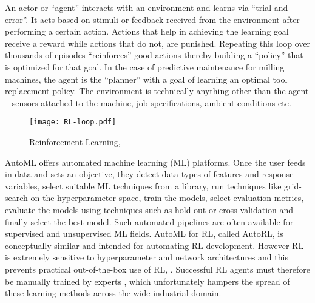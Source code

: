 \documentclass[referee, sn-mathphys-num]{sn-jnl}
\begin{document}
	An actor or ``agent'' interacts with an environment and learns via ``trial-and-error''. It acts based on stimuli or feedback received from the environment after performing a certain action. Actions that help in achieving the learning goal receive a reward while actions that do not, are punished. Repeating this loop over thousands of episodes ``reinforces'' good actions thereby building a ``policy'' that is optimized for that goal. In the case of predictive maintenance for milling machines, the agent is the ``planner'' with a goal of learning an optimal tool replacement policy. The environment is technically anything other than the agent -- sensors attached to the machine, job specifications, ambient conditions etc.
	\begin{figure}[h]
		\centering
		\texttt{[image: RL-loop.pdf]}
		\caption{Reinforcement Learning, \cite{barto2018}}
		\label{fig_RL-loop}
	\end{figure}
	
	AutoML offers automated machine learning (ML) platforms. Once the user feeds in data and sets an objective, they detect data types of features and response variables, select suitable ML techniques from a library, run techniques like grid-search on the hyperparameter space, train the models, select evaluation metrics, evaluate the models using techniques such as hold-out or cross-validation and finally select the best model. Such automated pipelines are often available for supervised and unsupervised ML fields. AutoML for RL, called AutoRL, is conceptually similar and intended for automating RL development. However RL is extremely sensitive to hyperparameter and network architectures and this prevents practical out-of-the-box use of RL, \cite{autorl:shala2022, autorl:afshar2022}. Successful RL agents must therefore be manually trained by experts \cite{autorl:parker2022}, which unfortunately hampers the spread of these learning methods across the wide industrial domain.
	
\end{document}

